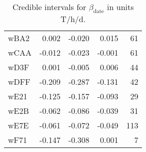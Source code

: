 \begin{table}[ht]
\begin{tabular}{lrrrr}
  wBA2 & 0.002 & -0.020 & 0.015 &   61 \\ 
  wCAA & -0.012 & -0.023 & -0.001 &   61 \\ 
  wD3F & 0.001 & -0.005 & 0.006 &   44 \\ 
  wDFF & -0.209 & -0.287 & -0.131 &   42 \\ 
  wE21 & -0.125 & -0.157 & -0.093 &   29 \\ 
  wE2B & -0.062 & -0.086 & -0.039 &   31 \\ 
  wE7E & -0.061 & -0.072 & -0.049 &  113 \\ 
  wF71 & -0.147 & -0.308 & 0.001 &    7 \\ 
   \hline
\end{tabular}
\endgroup
\caption{Credible intervals for $\beta_\text{date}$ in units T/h/d.} 
\label{tab:beta_date_all}
\end{table}
